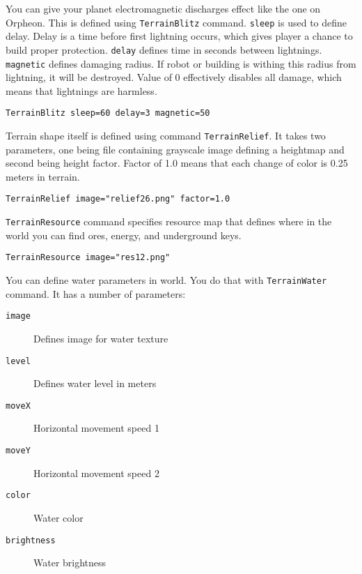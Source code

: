 
You can give your planet electromagnetic discharges effect like the one on Orpheon. This is defined using \texttt{TerrainBlitz} command. \texttt{sleep} is used to define delay. Delay is a time before first lightning occurs, which gives player a chance to build proper protection. \texttt{delay} defines time in seconds between lightnings. \texttt{magnetic} defines damaging radius. If robot or building is withing this radius from lightning, it will be destroyed. Value of 0 effectively disables all damage, which means that lightnings are harmless.

\begin{lstlisting}[style=scene]
TerrainBlitz sleep=60 delay=3 magnetic=50
\end{lstlisting}

Terrain shape itself is defined using command \texttt{TerrainRelief}. It takes two parameters, one being file containing grayscale image defining a heightmap and second being height factor. Factor of 1.0 means that each change of color is 0.25 meters in terrain.

\begin{lstlisting}[style=scene]
TerrainRelief image="relief26.png" factor=1.0
\end{lstlisting}

\texttt{TerrainResource} command specifies resource map that defines where in the world you can find ores, energy, and underground keys.

\begin{lstlisting}[style=scene]
TerrainResource image="res12.png"
\end{lstlisting}

You can define water parameters in world. You do that with \texttt{TerrainWater} command. It has a number of parameters:

\begin{description}
    \item[\texttt{image}] Defines image for water texture
    \item[\texttt{level}] Defines water level in meters
    \item[\texttt{moveX}] Horizontal movement speed 1
    \item[\texttt{moveY}] Horizontal movement speed 2
    \item[\texttt{color}] Water color
    \item[\texttt{brightness}] Water brightness
\end{description}

